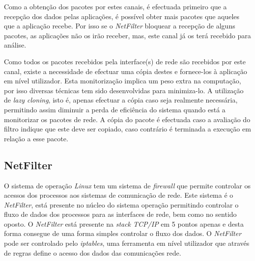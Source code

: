Como a obtenção dos pacotes por estes canais, é efectuada primeiro que a recepção dos dados pelas aplicações, é possível obter mais pacotes que aqueles que a aplicação recebe.
Por isso se o \textit{NetFilter} bloquear a recepção de alguns pacotes, as aplicações não os irão receber, mas, este canal já os terá recebido para análise.
 
 

Como todos os pacotes recebidos pela interface(s) de rede são recebidos por este canal, existe a necessidade de efectuar uma cópia destes e fornece-los à aplicação em nível utilizador.
Esta monitorização implica um peso extra na computação, por isso diversas técnicas tem sido desenvolvidas para minimiza-lo.
A utilização de \textit{lazy cloning}, isto é, apenas efectuar a cópia caso seja realmente necessária, permitindo assim diminuir a perda de eficiência do sistema quando está a monitorizar os pacotes de rede.
A cópia do pacote é efectuada caso a avaliação do filtro indique que este deve ser copiado, caso contrário é terminada a execução em relação a esse pacote.



\subsection{NetFilter}

O sistema de operação \textit{Linux} tem um sistema de \textit{firewall} que permite controlar os acessos dos processos aos sistemas de comunicação de rede.
 Este sistema é o \textit{NetFilter}, está presente no núcleo do sistema operação permitindo controlar o fluxo de dados dos processos para as interfaces de rede, bem como no sentido oposto.
 O \textit{NetFilter} está presente na \textit{stack TCP/IP} em 5 pontos apenas e desta forma consegue de uma forma simples controlar o fluxo dos dados.
 O \textit{NetFilter} pode ser controlado pelo \textit{iptables}, uma ferramenta em nível utilizador que através de regras define o acesso dos dados das comunicações rede.

